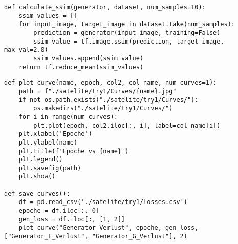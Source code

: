 \begin{lstlisting}[language=pyhaff, caption={Berechnung des SSIM-Score}, label={cod:ssim}]
def calculate_ssim(generator, dataset, num_samples=10):
    ssim_values = []
    for input_image, target_image in dataset.take(num_samples):
        prediction = generator(input_image, training=False)
        ssim_value = tf.image.ssim(prediction, target_image, max_val=2.0)
        ssim_values.append(ssim_value)
    return tf.reduce_mean(ssim_values)
\end{lstlisting}

\newpage

\begin{lstlisting}[language=pyhaff, caption={Ausschnitt zur Erstellung einer Verlaufskurve (CycleGAN Implementierung)}, label={cod:curve}]
def plot_curve(name, epoch, col2, col_name, num_curves=1):
    path = f"./satelite/try1/Curves/{name}.jpg"
    if not os.path.exists("./satelite/try1/Curves/"):
        os.makedirs("./satelite/try1/Curves/")
    for i in range(num_curves):
        plt.plot(epoch, col2.iloc[:, i], label=col_name[i])
    plt.xlabel('Epoche')
    plt.ylabel(name)
    plt.title(f'Epoche vs {name}')
    plt.legend()
    plt.savefig(path)
    plt.show()

def save_curves():
    df = pd.read_csv('./satelite/try1/losses.csv')
    epoche = df.iloc[:, 0]
    gen_loss = df.iloc[:, [1, 2]]
    plot_curve("Generator_Verlust", epoche, gen_loss, ["Generator_F_Verlust", "Generator_G_Verlust"], 2)
\end{lstlisting}